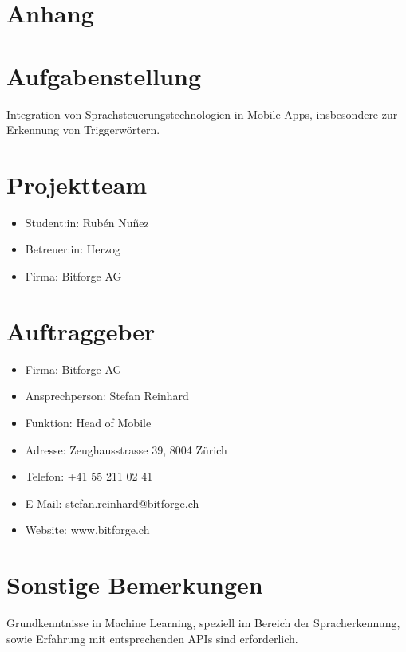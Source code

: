 \documentclass[11pt,a4paper]{article}
\newcommand\blankpage{%
    \null
    \thispagestyle{empty}%
    \addtocounter{page}{-1}%
    \newpage}
\begin{document}
\newpage
\section{Anhang}

\newpage

\listoffigures
{}
\listoftables
\printbibliography[title=Literaturverzeichnis, heading=bibintoc]





\newpage
\pagecolor{ba-gray}
\afterpage{\nopagecolor}
\blankpage

\newpage
\section*{Aufgabenstellung}
Integration von Sprachsteuerungstechnologien in Mobile Apps, insbesondere zur Erkennung
von Triggerwörtern.

\section*{Projektteam}
\begin{itemize}
    \item Student:in: Rubén Nuñez
    \item Betreuer:in: Herzog
    \item Firma: Bitforge AG
\end{itemize}

\section*{Auftraggeber}
\begin{itemize}
    \item Firma: Bitforge AG
    \item Ansprechperson: Stefan Reinhard
    \item Funktion: Head of Mobile
    \item Adresse: Zeughausstrasse 39, 8004 Zürich
    \item Telefon: +41 55 211 02 41
    \item E-Mail: stefan.reinhard@bitforge.ch
    \item Website: www.bitforge.ch
\end{itemize}



\section*{Sonstige Bemerkungen}
Grundkenntnisse in Machine Learning, speziell im Bereich der Spracherkennung, sowie
Erfahrung mit entsprechenden APIs sind erforderlich.
\end{document}
